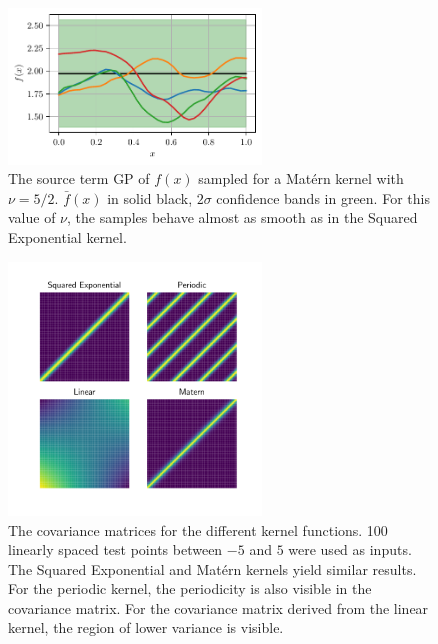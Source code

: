 \documentclass[%
  a4paper,oneside,%
  11pt,%
  smallchapters,
  style=printdev,
  extramargin,
  green,%
  rgb, <cmyk>
  ]{tubsbook}
\begin{document}
\begin{figure}[!ht]
\begin{center}

\includegraphics[width=0.6\textwidth]{pics/matern5_2_f_sampled}
\caption[Samples from a GP with a Mat\'ern kernel 3]{The source term GP of $f(x)$ sampled for a Mat\'ern kernel with $\nu=5/2$. $\bar{f}(x)$ in solid black, $2\sigma$ confidence bands in green. For this value of $\nu$, the samples behave almost as smooth as in the Squared Exponential kernel.}
\label{fig:Matern5_2}

\end{center}
\end{figure}




\begin{figure}[!ht]
\begin{center}
\includegraphics[width=0.6\textwidth]{pics/CovMats.pdf}
\caption[Illustration of the covartiance matrices fpr different kernel functions]{The covariance matrices for the different kernel functions. 100 linearly spaced test points between $-5$ and $5$ were used as inputs. The Squared Exponential and Mat\'ern kernels yield similar results. For the periodic kernel, the periodicity is also visible in the covariance matrix. For the covariance matrix derived from the linear kernel, the region of lower variance is visible.}
\label{fig:CovMats}
\end{center}
\end{figure}
\end{document}
